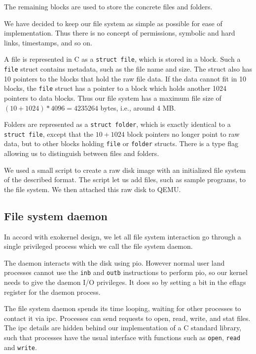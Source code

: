 \documentclass{article}
\begin{document}
The remaining blocks are used to store the concrete files and folders.

We have decided to keep our file system as simple as possible for ease of
implementation. Thus there is no concept of permissions, symbolic and hard
links, timestamps, and so on.


A file is represented in C as a \texttt{struct file}, which is stored in a
block. Such a \texttt{file} struct contains metadata, such as the file name
and size. The struct also has 10 pointers to the blocks that hold
the raw file data. If the data cannot fit in 10 blocks, the \texttt{file}
struct has a pointer to a block which holds another 1024 pointers to data
blocks. Thus our file system has a maximum file size of $(10+1024)*4096
= 4235264$ bytes, i.e., around 4 MB.


Folders are represented as a \texttt{struct folder}, which is exactly
identical to a \texttt{struct file}, except that the $10+1024$ block
pointers no longer point to raw data, but to other blocks holding
\texttt{file} or \texttt{folder} structs. There is a type flag allowing us to
distinguish between files and folders.

We used a small script to create a raw disk image with an initialized file
system of the described format. The script let us add files, such as sample
programs, to the file system. We then attached this raw disk to QEMU.


\subsection{File system daemon}
In accord with exokernel design, we let all file system interaction go through
a single privileged process which we call the file system daemon.

The daemon interacts with the disk using \gls{pio}. However normal user land
processes cannot use the \texttt{inb} and \texttt{outb} instructions to
perform \gls{pio}, so our kernel needs to give the daemon I/O privileges. It
does so by setting a bit in the \gls{eflags} register for the daemon process.

The file system daemon spends its time looping, waiting for other processes to
contact it via \gls{ipc}. Processes can send requests to open, read, write,
and stat files. The \gls{ipc} details are hidden behind our implementation of
a C standard library, such that processes have the usual interface with
functions such as \texttt{open}, \texttt{read} and \texttt{write}.
\end{document}
